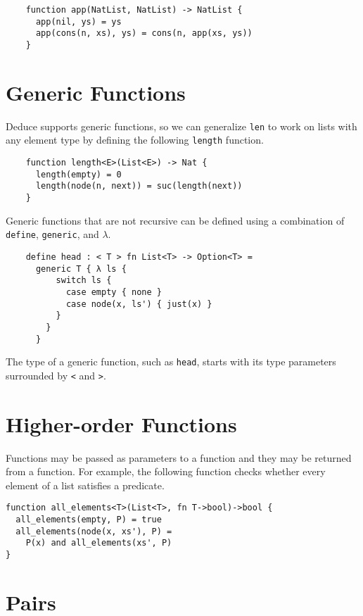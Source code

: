 \documentclass[12pt]{article}
\begin{document}
\begin{verbatim}
    function app(NatList, NatList) -> NatList {
      app(nil, ys) = ys
      app(cons(n, xs), ys) = cons(n, app(xs, ys))
    }
\end{verbatim}

\section{Generic Functions}

Deduce supports generic functions, so we can generalize \texttt{len}
to work on lists with any element type by defining the following
\texttt{length} function.

\begin{verbatim}
    function length<E>(List<E>) -> Nat {
      length(empty) = 0
      length(node(n, next)) = suc(length(next))
    }
\end{verbatim}

Generic functions that are not recursive can be defined using a
combination of \texttt{define}, \texttt{generic}, and $\lambda$.

\begin{verbatim}
    define head : < T > fn List<T> -> Option<T> =
      generic T { λ ls { 
          switch ls {
            case empty { none }
            case node(x, ls') { just(x) }
          }
        }
      }
\end{verbatim}

\noindent The type of a generic function, such as \texttt{head},
starts with its type parameters surrounded by \texttt{<} and \texttt{>}.

\section{Higher-order Functions}

Functions may be passed as parameters to a function and they may be
returned from a function. For example, the following function checks
whether every element of a list satisfies a predicate.

\begin{verbatim}
function all_elements<T>(List<T>, fn T->bool)->bool {
  all_elements(empty, P) = true
  all_elements(node(x, xs'), P) = 
    P(x) and all_elements(xs', P)
}
\end{verbatim}

\section{Pairs}
\end{document}
